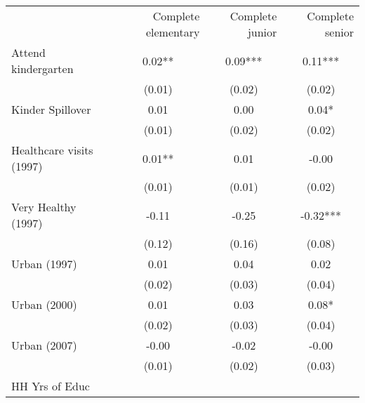 \begin{tabular}{llll}
\cline{1-4}
\multicolumn{1}{c}{} &
  \multicolumn{1}{|r}{Complete elementary} &
  \multicolumn{1}{r}{Complete junior} &
  \multicolumn{1}{r}{Complete senior} \\
\cline{1-4}
\multicolumn{1}{l}{Attend kindergarten} &
  \multicolumn{1}{|c}{0.02** } &
  \multicolumn{1}{c}{0.09***} &
  \multicolumn{1}{c}{0.11***} \\
\multicolumn{1}{l}{} &
  \multicolumn{1}{|c}{(0.01)} &
  \multicolumn{1}{c}{(0.02)} &
  \multicolumn{1}{c}{(0.02)} \\
\multicolumn{1}{l}{Kinder Spillover} &
  \multicolumn{1}{|c}{0.01 } &
  \multicolumn{1}{c}{0.00 } &
  \multicolumn{1}{c}{0.04* } \\
\multicolumn{1}{l}{} &
  \multicolumn{1}{|c}{(0.01)} &
  \multicolumn{1}{c}{(0.02)} &
  \multicolumn{1}{c}{(0.02)} \\
\multicolumn{1}{l}{Healthcare visits (1997)} &
  \multicolumn{1}{|c}{0.01** } &
  \multicolumn{1}{c}{0.01 } &
  \multicolumn{1}{c}{-0.00 } \\
\multicolumn{1}{l}{} &
  \multicolumn{1}{|c}{(0.01)} &
  \multicolumn{1}{c}{(0.01)} &
  \multicolumn{1}{c}{(0.02)} \\
\multicolumn{1}{l}{Very Healthy (1997)} &
  \multicolumn{1}{|c}{-0.11 } &
  \multicolumn{1}{c}{-0.25 } &
  \multicolumn{1}{c}{-0.32***} \\
\multicolumn{1}{l}{} &
  \multicolumn{1}{|c}{(0.12)} &
  \multicolumn{1}{c}{(0.16)} &
  \multicolumn{1}{c}{(0.08)} \\
\multicolumn{1}{l}{Urban (1997)} &
  \multicolumn{1}{|c}{0.01 } &
  \multicolumn{1}{c}{0.04 } &
  \multicolumn{1}{c}{0.02 } \\
\multicolumn{1}{l}{} &
  \multicolumn{1}{|c}{(0.02)} &
  \multicolumn{1}{c}{(0.03)} &
  \multicolumn{1}{c}{(0.04)} \\
\multicolumn{1}{l}{Urban (2000)} &
  \multicolumn{1}{|c}{0.01 } &
  \multicolumn{1}{c}{0.03 } &
  \multicolumn{1}{c}{0.08* } \\
\multicolumn{1}{l}{} &
  \multicolumn{1}{|c}{(0.02)} &
  \multicolumn{1}{c}{(0.03)} &
  \multicolumn{1}{c}{(0.04)} \\
\multicolumn{1}{l}{Urban (2007)} &
  \multicolumn{1}{|c}{-0.00 } &
  \multicolumn{1}{c}{-0.02 } &
  \multicolumn{1}{c}{-0.00 } \\
\multicolumn{1}{l}{} &
  \multicolumn{1}{|c}{(0.01)} &
  \multicolumn{1}{c}{(0.02)} &
  \multicolumn{1}{c}{(0.03)} \\
\multicolumn{1}{l}{HH Yrs of Educ} &

\end{tabular}
